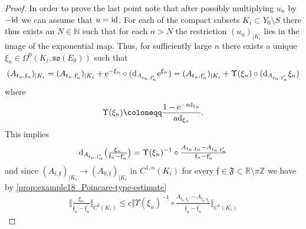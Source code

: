 \documentclass[11pt,a4paper]{scrartcl}
\newcommand*\diff{\mathop{}\!\textup{d}}
\newcommand{\ad}{\textup{ad}}
\newcommand{\e}{\textup{e}}
\newcommand{\id}{\textup{id}}
\newcommand{\VertC}[2]{\Vert_{C^{{#1}}{#2}}}
\numberwithin{equation}{section}
\theoremstyle{plain}
\theoremstyle{definition}
\theoremstyle{remark}
\begin{document}
\begin{proof}
In order to prove the last point note that after possibly multiplying $u_n$ by $-\id$ we can assume that $u = \id$. For each of the compact subsets $K_i \subset Y_0\setminus S$ there thus exists an $N\in \mathbb{N}$ such that for each $n>N$ the restriction $(u_n)_{\vert K_i}$ lies in the image of the exponential map. Thus, for sufficiently large $n$ there exists a unique $\xi_n \in \Omega^{0}(K_i,\mathfrak{so}(E_0))$ such that \[ (A_{t_n,\mathfrak{f}_n})_{\vert K_i} = (A_{t_n,\mathfrak{f}_n^\prime})_{\vert K_i} + \e^{-\xi_n} \circ (\diff_{A_{t_n,\mathfrak{f}_n^\prime}} \e^{\xi_n}) = (A_{t_n,\mathfrak{f}_n^\prime})_{\vert K_i} + \Upsilon(\xi_n) \circ (\diff_{A_{t_n,\mathfrak{f}_n^\prime}} \xi_n) \] where \[\Upsilon(\xi_n) \coloneqq \frac{1-\e^{-\ad_{\xi_n}}}{\ad_{\xi_n}}. \] This implies \begin{align*}
\diff_{A_{t_n,\mathfrak{f}_n^\prime}} \big(\tfrac{\xi_n}{\mathfrak{f}_n-\mathfrak{f}_n^\prime} \big) = \Upsilon(\xi_n)^{-1} \circ \tfrac{A_{t_n,\mathfrak{f}_n}-A_{t_n,\mathfrak{f}_n^\prime}}{\mathfrak{f}_n-\mathfrak{f}_n^\prime}
\end{align*}
and since $(A_{t,\mathfrak{f}})_{\vert K_i} \to (A_{0,\mathfrak{f}})_{\vert K_i}$ in $C^{1,\alpha}(K_i)$ for every $\mathfrak{f} \in \mathfrak{F}\subset \mathbb{R}\setminus \pi \mathbb{Z}$ we have by \autoref{prop:example18_Poincare-type-estimate} 
\begin{align}\label{equ:example18_estimate_on_xi_n/f_n}
\Vert \tfrac{\xi_n}{\mathfrak{f}_n-\mathfrak{f}_n^\prime} \VertC{2}{(K_i)} \leq c \Vert \Upsilon(\xi_n)^{-1} \circ \tfrac{A_{t_n,\mathfrak{f}_n}-A_{t_n,\mathfrak{f}_n^\prime}}{\mathfrak{f}_n-\mathfrak{f}_n^\prime} \VertC{1}{(K_i)}
\end{align} 

\end{proof}
\end{document}
